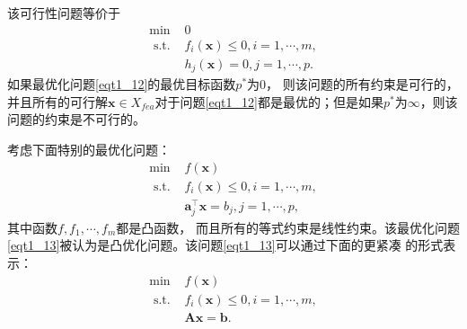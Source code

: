 该可行性问题等价于
\begin{equation}
\begin{array}{ll}
\min & 0 \\
\text { s.t. } & f_{i}(\bm{x}) \leq 0, i=1, \cdots, m ,\\
& h_{j}(\bm{x})=0, j=1, \cdots, p .
\end{array}
    \label{eqt1_12}
\end{equation}
如果最优化问题\ref{eqt1_12}的最优目标函数$  p^{*}  $为$ 0 $， 则该问题的所有约束是可行的，并且所有的可行解$  \bm{x} \in X_{f e a}  $对于问题\ref{eqt1_12}都是最优的；但是如果$  p^{*}  $为$\infty $，则该问题的约束是不可行的。
\par 考虑下面特别的最优化问题：
\begin{equation}
\begin{array}{ll}
\min & f(\bm{x}) \\
\text { s.t. } & f_{i}(\bm{x}) \leq 0, i=1, \cdots, m, \\
& \bm{a}_{j}^{\top} \bm{x}=b_{j}, j=1, \cdots, p,
\end{array}
    \label{eqt1_13}
\end{equation}
其中函数$  f, f_{1}, \cdots, f_{m}  $都是凸函数， 而且所有的等式约束是线性约束。该最优化问题\ref{eqt1_13}被认为是凸优化问题。该问题\ref{eqt1_13}可以通过下面的更紧凑 的形式表示：
\begin{equation}
\begin{array}{ll}
\min & f(\bm{x}) \\
\text { s.t. } & f_{i}(\bm{x}) \leq 0, i=1, \cdots, m, \\
& \bm{A} \bm{x}=\bm{b} .
\end{array}
    \label{eqt1_14}
\end{equation}

